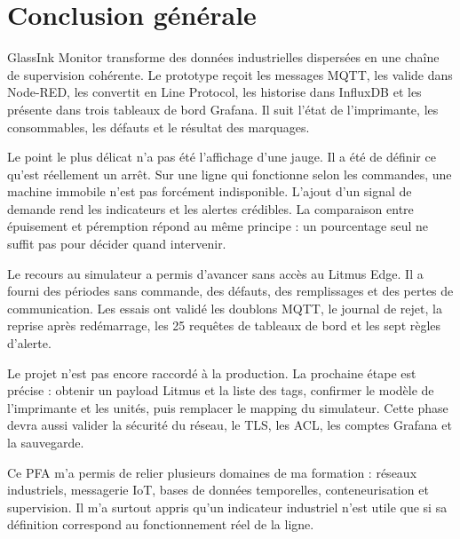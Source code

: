 \chapter{Conclusion générale}

GlassInk Monitor transforme des données industrielles dispersées en une chaîne
de supervision cohérente. Le prototype reçoit les messages MQTT, les valide
dans Node-RED, les convertit en Line Protocol, les historise dans InfluxDB et
les présente dans trois tableaux de bord Grafana. Il suit l'état de l'imprimante,
les consommables, les défauts et le résultat des marquages.

Le point le plus délicat n'a pas été l'affichage d'une jauge. Il a été de
définir ce qu'est réellement un arrêt. Sur une ligne qui fonctionne selon les
commandes, une machine immobile n'est pas forcément indisponible. L'ajout d'un
signal de demande rend les indicateurs et les alertes crédibles. La comparaison
entre épuisement et péremption répond au même principe : un pourcentage seul ne
suffit pas pour décider quand intervenir.

Le recours au simulateur a permis d'avancer sans accès au Litmus Edge. Il a
fourni des périodes sans commande, des défauts, des remplissages et des pertes
de communication. Les essais ont validé les doublons MQTT, le journal de rejet,
la reprise après redémarrage, les 25 requêtes de tableaux de bord et les sept
règles d'alerte.

Le projet n'est pas encore raccordé à la production. La prochaine étape est
précise : obtenir un payload Litmus et la liste des tags, confirmer le modèle
de l'imprimante et les unités, puis remplacer le mapping du simulateur. Cette
phase devra aussi valider la sécurité du réseau, le TLS, les ACL, les comptes
Grafana et la sauvegarde.

Ce PFA m'a permis de relier plusieurs domaines de ma formation : réseaux
industriels, messagerie IoT, bases de données temporelles, conteneurisation et
supervision. Il m'a surtout appris qu'un indicateur industriel n'est utile que
si sa définition correspond au fonctionnement réel de la ligne.

